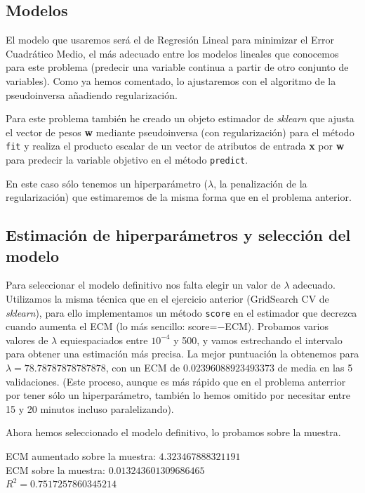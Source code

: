 \documentclass[a4]{article}
\begin{document}
\subsection{Modelos}

El modelo que usaremos será el de Regresión Lineal para minimizar el
Error Cuadrático Medio, el más adecuado entre los modelos lineales que
conocemos para este problema (predecir una variable continua a partir
de otro conjunto de variables). Como ya hemos comentado, lo
ajustaremos con el algoritmo de la pseudoinversa añadiendo
regularización.

Para este problema también he creado un objeto estimador de
\textit{sklearn} que ajusta el vector de pesos \textbf{w} mediante
pseudoinversa (con regularización) para el método \texttt{fit} y
realiza el producto escalar de un vector de atributos de entrada
\textbf{x} por \textbf{w} para predecir la variable objetivo en el
método \texttt{predict}.

En este caso sólo tenemos un hiperparámetro
($\lambda$, la penalización de la regularización) que estimaremos de
la misma forma que en el problema anterior.

\subsection{Estimación de hiperparámetros y selección del modelo}

Para seleccionar el modelo definitivo nos falta elegir un valor de
$\lambda$ adecuado. Utilizamos la misma técnica que en el ejercicio
anterior (GridSearch CV de \textit{sklearn}), para ello implementamos
un método \texttt{score} en el estimador que decrezca cuando aumenta
el ECM (lo más sencillo: score=$-$ECM). Probamos varios valores de
$\lambda$ equiespaciados entre $10^{-4}$ y 500, y vamos estrechando el
intervalo para obtener una estimación más precisa. La mejor puntuación
la obtenemos para $\lambda=78.78787878787878$, con un ECM de
$0.02396088923493373$ de media en las 5 validaciones. (Este proceso,
aunque es más rápido que en el problema anterrior por tener sólo un
hiperparámetro, también lo hemos omitido por necesitar entre 15 y 20
minutos incluso paralelizando).

Ahora hemos seleccionado el modelo definitivo, lo probamos sobre la
muestra.

ECM aumentado sobre la muestra: $4.323467888321191$ \\ 
ECM sobre la muestra: $0.013243601309686465$ \\
$R^2= 0.7517257860345214$
\end{document}
